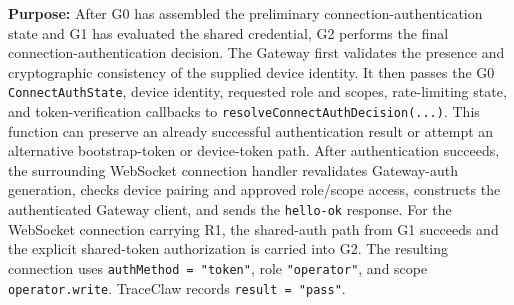 \textbf{Purpose:}
After G0 has assembled the preliminary connection-authentication state
and G1 has evaluated the shared credential, G2 performs the final
connection-authentication decision. The Gateway first validates the
presence and cryptographic consistency of the supplied device identity.
It then passes the G0 \texttt{ConnectAuthState}, device identity,
requested role and scopes, rate-limiting state, and token-verification
callbacks to \texttt{resolveConnectAuthDecision(...)}. This function
can preserve an already successful authentication result or attempt an
alternative bootstrap-token or device-token path. After authentication
succeeds, the surrounding WebSocket connection handler revalidates
Gateway-auth generation, checks device pairing and approved role/scope
access, constructs the authenticated Gateway client, and sends the
\texttt{hello-ok} response. For the WebSocket connection carrying
R1, the shared-auth path from G1 succeeds and the explicit
shared-token authorization is carried into G2.
The resulting connection uses
\texttt{authMethod = "token"}, role
\texttt{"operator"}, and scope \texttt{operator.write}.
TraceClaw records \texttt{result = "pass"}.


